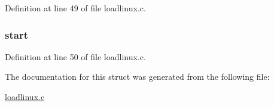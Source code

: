 \-Definition at line 49 of file loadlinux.\-c.

\hypertarget{structatag__ramdisk_a61eb63d26b2fa6c2971603ceccffb14b}{
\subsubsection[{start}]{ {\bf start}}}\label{structatag__ramdisk_a61eb63d26b2fa6c2971603ceccffb14b}


\-Definition at line 50 of file loadlinux.\-c.



\-The documentation for this struct was generated from the following file\-:\begin{DoxyCompactItemize}
\item 
\hyperlink{loadlinux_8c}{loadlinux.\-c}\end{DoxyCompactItemize}
